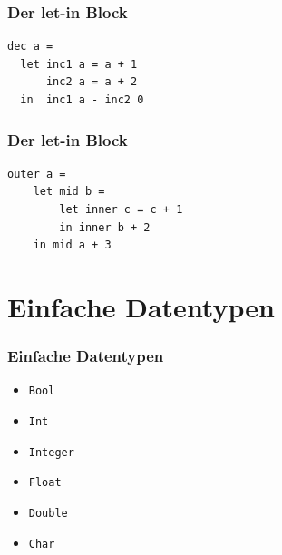 \begin{frame}[fragile]
\frametitle{Der let-in Block}
\begin{lstlisting}
dec a = 
  let inc1 a = a + 1
      inc2 a = a + 2
  in  inc1 a - inc2 0
\end{lstlisting}
\end{frame}

\begin{frame}[fragile]
\frametitle{Der let-in Block}
\begin{lstlisting}
outer a = 
    let mid b = 
        let inner c = c + 1
        in inner b + 2
    in mid a + 3	
\end{lstlisting}
\end{frame}

\section{Einfache Datentypen}
\begin{frame}
\frametitle{Einfache Datentypen}
\begin{block}{\vspace*{-3ex}}
\begin{itemize}
  \item \lstinline|Bool|
  \item \lstinline|Int|
  \item \lstinline|Integer|
  \item \lstinline|Float|
  \item \lstinline|Double|
  \item \lstinline|Char|
\end{itemize}
\end{block}
\end{frame}
